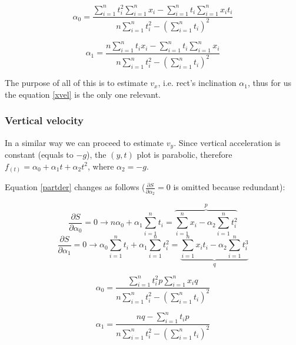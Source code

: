 \documentclass[notitlepage,a4paper,11pt]{article} %
\begin{document}
			\begin{equation}
					\alpha_0 = \frac
					{\sum_{i=1}^n t_i^2 \sum_{i=1}^n x_i - \sum_{i=1}^n t_i \sum_{i=1}^n x_i t_i}
					{n \sum_{i=1}^n t_i^2 - (\sum_{i=1}^n t_i)^2}
			\end{equation}

			\begin{equation} \label{xvel}
					\alpha_1 = \frac
					{n \sum_{i=1}^n t_i x_i - \sum_{i=1}^n t_i \sum_{i=1}^n x_i}
					{n \sum_{i=1}^n t_i^2 - (\sum_{i=1}^n t_i)^2}
			\end{equation}

			The purpose of all of this is to estimate $v_x$, i.e. rect's inclination $\alpha_1$, thus for us the equation \eqref{xvel} is the only one relevant.

		\subsubsection{Vertical velocity}

			In a similar way we can proceed to estimate $v_y$. Since vertical acceleration is constant (equals to $-g$), the $(y,t)$ plot is parabolic, therefore $f_{(t)} = \alpha_0 + \alpha_1 t + \alpha_2 t^2$, where $\alpha_2 = -g$.

			Equation \eqref{partder} changes as follows ($\frac{\partial S}{\partial \alpha_2} = 0$ is omitted because redundant):

			\begin{equation}
				\frac{\partial S}{\partial \alpha_0} = 0 \to
				n \alpha_0 + \alpha_1 \sum_{i=1}^n t_i =
					\overbrace{\sum_{i=1}^n x_i - \alpha_2 \sum_{i=1}^n t_i^2}^p
			\end{equation}
			\begin{equation}
				\frac{\partial S}{\partial \alpha_1} = 0 \to
				\alpha_0 \sum_{i=1}^n t_i + \alpha_1 \sum_{i=1}^n t_i^2 =
					\underbrace{\sum_{i=1}^n x_i t_i - \alpha_2 \sum_{i=1}^n t_i^3}_q
			\end{equation}

			\begin{equation}
					\alpha_0 = \frac
					{\sum_{i=1}^n t_i^2 p \sum_{i=1}^n x_i q}{n \sum_{i=1}^n t_i^2 - (\sum_{i=1}^n t_i)^2}
			\end{equation}

			\begin{equation} \label{yvel}
					\alpha_1 = \frac
					{n q - \sum_{i=1}^n t_i p}{n \sum_{i=1}^n t_i^2 - (\sum_{i=1}^n t_i)^2}
			\end{equation}
\end{document}

